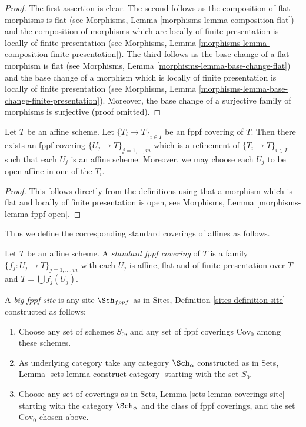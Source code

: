 \begin{proof}
The first assertion is clear.
The second follows as the composition of flat morphisms is flat
(see Morphisms, Lemma \ref{morphisms-lemma-composition-flat})
and the composition of morphisms which are locally of finite presentation is
locally of finite presentation
(see Morphisms, Lemma \ref{morphisms-lemma-composition-finite-presentation}).
The third follows as the base change of a flat morphism is flat
(see Morphisms, Lemma \ref{morphisms-lemma-base-change-flat})
and the base change of a morphism which is locally of finite presentation is
locally of finite presentation
(see Morphisms, Lemma \ref{morphisms-lemma-base-change-finite-presentation}).
Moreover, the base change of a surjective family of morphisms is surjective
(proof omitted).
\end{proof}

\begin{lemma}
\label{lemma-fppf-affine}
Let $T$ be an affine scheme.
Let $\{T_i \to T\}_{i \in I}$ be an fppf covering of $T$.
Then there exists an fppf covering
$\{U_j \to T\}_{j = 1, \ldots, m}$ which is a refinement
of $\{T_i \to T\}_{i \in I}$ such that each $U_j$ is an affine
scheme. Moreover, we may choose each $U_j$ to be open affine
in one of the $T_i$.
\end{lemma}

\begin{proof}
This follows directly from the definitions using that a
morphism which is flat and locally of finite presentation is open,
see Morphisms, Lemma \ref{morphisms-lemma-fppf-open}.
\end{proof}

\noindent
Thus we define the corresponding standard coverings of affines as follows.

\begin{definition}
\label{definition-standard-fppf}
Let $T$ be an affine scheme. A {\it standard fppf covering}
of $T$ is a family $\{f_j : U_j \to T\}_{j = 1, \ldots, m}$
with each $U_j$ is affine, flat and of finite presentation over $T$
and $T = \bigcup f_j(U_j)$.
\end{definition}

\begin{definition}
\label{definition-big-fppf-site}
A {\it big fppf site} is any site $\Sch_{fppf}$ as in
Sites, Definition \ref{sites-definition-site} constructed as follows:
\begin{enumerate}
\item Choose any set of schemes $S_0$, and any set of fppf coverings
$\text{Cov}_0$ among these schemes.
\item As underlying category take any category $\Sch_\alpha$
constructed as in Sets, Lemma \ref{sets-lemma-construct-category}
starting with the set $S_0$.
\item Choose any set of coverings as in
Sets, Lemma \ref{sets-lemma-coverings-site} starting with the
category $\Sch_\alpha$ and the class of fppf coverings,
and the set $\text{Cov}_0$ chosen above.
\end{enumerate}
\end{definition}

